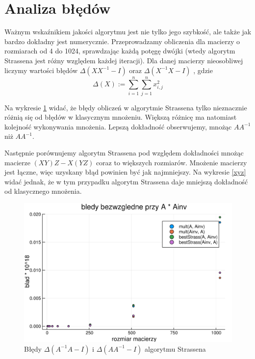 \documentclass[paper=a4, fontsize=11pt]{scrartcl} %
\numberwithin{equation}{section} %
\numberwithin{figure}{section} %
\numberwithin{table}{section} %
\begin{document}
\section{Analiza błędów}
Ważnym wskaźnikiem jakości algorytmu jest nie tylko jego szybkość, ale także jak bardzo dokładny jest numerycznie.
Przeprowadzamy obliczenia dla macierzy o rozmiarach od 4 do 1024, 
sprawdzając każdą potęgę dwójki (wtedy algorytm Strassena jest różny względem każdej iteracji). Dla danej macierzy nieosobliwej liczymy wartości błędów 
$\Delta(X X^{-1} - I)$ oraz $\Delta(X^{-1}X - I)$ , gdzie 
$${\Delta(X) := \sum_{i=1}^n \sum_{j=1}^n x_{i,j}^2 }$$ \medbreak

Na wykresie \ref{blad} widać, że błędy obliczeń w algorytmie Strassena tylko nieznacznie różnią się od błędów w klasycznym mnożeniu.
Większą różnicę ma natomiast kolejność wykonywania mnożenia.
Lepszą dokładność obserwujemy, mnożąc ${A A^{-1} }$ niż ${A A^{-1} }$.\medbreak

Następnie porównujemy algorytm Strassena pod względem dokładności mnożąc macierze ${(X Y)Z - X(Y Z) }$ coraz to większych rozmiarów.
Mnożenie macierzy jest łączne, więc uzyskany błąd powinien być jak najmniejszy. 
Na wykresie \ref{xyz} widać jednak, że w tym przypadku algorytm Strassena daje mniejszą dokładność od klasycznego mnożenia.

\begin{figure}[h!]
  \includegraphics[width=\linewidth]{inv.jpg}
  \caption{Błędy $\Delta(A^{-1}A - I)$ i $\Delta(A A^{-1} - I)$ algorytmu Strassena}
  \label{blad}
\end{figure}
\end{document}
